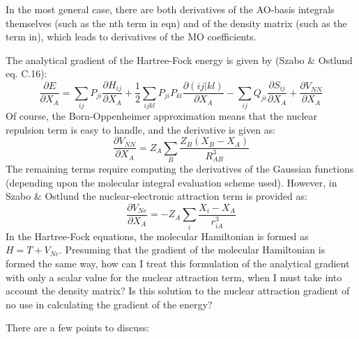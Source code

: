 \documentclass[%
class = book,%
crop = false,%
float = true,%
multi = true,%
preview = false,%
]{standalone}
\begin{document}
In the most general case, there are both derivatives of the AO-basis integrals themselves (such as the nth term in eqn) and of the density matrix (such as the term in), which leads to derivatives of the MO coefficients.

The analytical gradient of the Hartree-Fock energy is given by (Szabo \& Ostlund eq. C.16):
\begin{equation}
  \frac{\partial E}{\partial X_{A}} = \sum_{ij}{P_{ji} \frac{\partial H_{ij}}{\partial X_{A}}} + \frac{1}{2} \sum_{ijkl}{P_{ji}P_{kl} \frac{\partial (ij|kl)}{\partial X_{A}}} - \sum_{ij}{Q_{ji} \frac{\partial S_{ij}}{\partial X_{A}}} + \frac{\partial V_{NN}}{\partial X_{A}}
\end{equation}
Of course, the Born-Oppenheimer approximation means that the nuclear repulsion term is easy to handle, and the derivative is given as:
\begin{equation}
  \frac{\partial V_{NN}}{\partial X_{A}} = Z_{A} \sum_{B} \frac{Z_{B} (X_{B} - X_{A})}{R_{AB}^{3}}
\end{equation}
The remaining terms require computing the derivatives of the Gaussian functions (depending upon the molecular integral evaluation scheme used). However, in Szabo \& Ostlund the nuclear-electronic attraction term is provided as:
\begin{equation}
  \frac{\partial V_{Ne}}{\partial X_{A}} = -Z_{A} \sum_{i} \frac{X_{i} - X_{A}}{r_{iA}^{3}}
\end{equation}
In the Hartree-Fock equations, the molecular Hamiltonian is formed as \(H = T + V_{Ne}\). Presuming that the gradient of the molecular Hamiltonian is formed the same way, how can I treat this formulation of the analytical gradient with only a scalar value for the nuclear attraction term, when I must take into account the density matrix? Is this solution to the nuclear attraction gradient of no use in calculating the gradient of the energy?

There are a few points to discuss:
\end{document}
